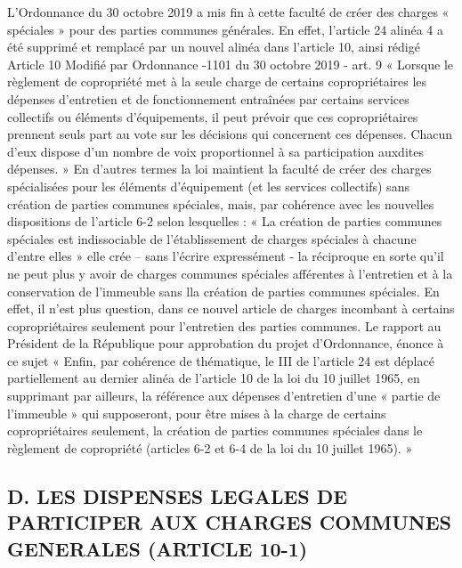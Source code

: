 		L’Ordonnance du 30 octobre 2019 a mis fin à cette faculté de créer des charges « spéciales » pour des parties communes générales. En effet, l’article 24 alinéa 4 a été supprimé et remplacé par un nouvel alinéa dans l’article 10, ainsi rédigé Article 10 Modifié par Ordonnance -1101 du 30 octobre 2019 - art. 9 « Lorsque le règlement de copropriété met à la seule charge de certains copropriétaires les dépenses d'entretien et de fonctionnement entraînées par certains services collectifs ou éléments d'équipements, il peut prévoir que ces copropriétaires prennent seuls part au vote sur les décisions qui concernent ces dépenses. Chacun d'eux dispose d'un nombre de voix proportionnel à sa participation auxdites dépenses. » En d’autres termes la loi maintient la faculté de créer des charges spécialisées pour les éléments d’équipement (et les services collectifs) sans création de parties communes spéciales, mais, par cohérence avec les nouvelles dispositions de l’article 6-2 selon lesquelles : « La création de parties communes spéciales est indissociable de l'établissement de charges spéciales à chacune d'entre elles » elle crée – sans l’écrire expressément - la réciproque en sorte qu’il ne peut plus y avoir de charges communes spéciales afférentes à l’entretien et à la conservation de l’immeuble sans lla création de parties communes spéciales. En effet, il n’est plus question, dans ce nouvel article de charges incombant à certains copropriétaires seulement pour l’entretien des parties communes. Le rapport au Président de la République pour approbation du projet d’Ordonnance, énonce à ce sujet « Enfin, par cohérence de thématique, le III de l'article 24 est déplacé partiellement au dernier alinéa de l'article 10 de la loi du 10 juillet 1965, en supprimant par ailleurs, la référence aux dépenses d'entretien d'une « partie de l'immeuble » qui supposeront, pour être mises à la charge de certains copropriétaires seulement, la création de parties communes spéciales dans le règlement de copropriété (articles 6-2 et 6-4 de la loi du 10 juillet 1965). »
	
	\subsection{D. LES DISPENSES LEGALES DE PARTICIPER AUX CHARGES COMMUNES GENERALES (ARTICLE 10-1)}
	
